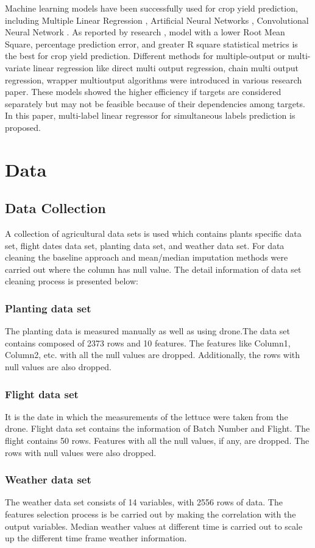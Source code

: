 \documentclass{article}
\begin{document}
Machine learning models have been successfully used for crop yield prediction, including Multiple Linear Regression \cite{ramesh2015analysis}, Artificial Neural Networks \cite{dahikar2014agricultural}, Convolutional Neural Network \cite{nevavuori2019crop}. As reported by research \cite{shastry2017prediction}, model with a lower Root Mean Square, percentage prediction error, and greater R square statistical metrics is the best for crop yield prediction. Different methods for multiple-output or multi-variate linear regression like direct multi output regression, chain multi output regression, wrapper multioutput algorithms were introduced in various research paper. These models showed the higher efficiency if targets are considered separately but may not be feasible because of their dependencies among targets. In this paper, multi-label linear regressor for simultaneous labels prediction is proposed.


\section{Data}
\subsection{Data Collection}
A collection of agricultural data sets is used which contains plants specific data set, flight dates data set, planting data set, and weather data set. For data cleaning the baseline approach and mean/median imputation methods were carried out where the column has null value. The detail information of data set cleaning process is presented below:
\subsubsection{Planting data set}
The planting data is measured manually as well as using drone.The data set contains composed of 2373 rows and 10 features. The features like Column1, Column2, etc. with all the null values are dropped. Additionally, the rows with null values are also dropped.
\subsubsection{Flight  data set}
It is the date in which the measurements of the lettuce were taken from the drone. Flight data set contains the information of Batch Number and Flight. The flight contains 50 rows. Features with all the null values, if any, are dropped. The rows with null values were also dropped.
\subsubsection{Weather data set}
The weather data set consists of 14 variables, with 2556 rows of data. The features selection process is be carried out by making the correlation with the output variables. Median weather values at different time is carried out to scale up the different time frame weather information.
\end{document}

